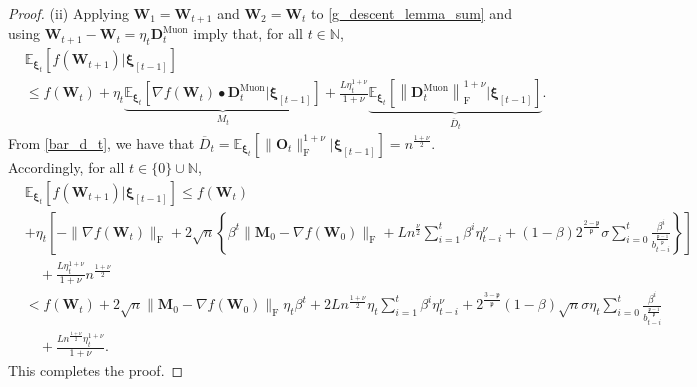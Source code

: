 \documentclass[10pt,a4paper]{amsart}
\begin{document}
\begin{proof}
(ii) Applying $\bm{W}_1 = \bm{W}_{t+1}$ and $\bm{W}_2 = \bm{W}_t$ to \eqref{g_descent_lemma_sum} and using $\bm{W}_{t+1} - \bm{W}_t = \eta_t \bm{D}_t^{\mathrm{Muon}}$ imply that, for all $t \in \mathbb{N}$,
\begin{align*}
&\mathbb{E}_{\bm{\xi}_t} \left[ f(\bm{W}_{t+1})|\bm{\xi}_{[t-1]} \right]\\
&\leq 
f(\bm{W}_t) 
+ \eta_t 
\underbrace{\mathbb{E}_{\bm{\xi}_t} \left[ \nabla f (\bm{W}_t) \bullet \bm{D}_t^{\mathrm{Muon}} |\bm{\xi}_{[t-1]} \right]}_{M_t}
+ \frac{L \eta_t^{1 + \nu}}{1 + \nu} 
\underbrace{\mathbb{E}_{\bm{\xi}_t} \left[
\left\| \bm{D}_t^{\mathrm{Muon}} \right\|_{\mathrm{F}}^{1 + \nu} \Big| \bm{\xi}_{[t-1]} \right]}_{\overline{D}_t}.
\end{align*}
From \eqref{bar_d_t}, we have that $\overline{D}_t = \mathbb{E}_{\bm{\xi}_t} [ \| \bm{O}_t \|_{\mathrm{F}}^{1 + \nu} | \bm{\xi}_{[t-1]}] = n^{\frac{1 + \nu}{2}}$. Accordingly, for all $t \in \{0\} \cup \mathbb{N}$,
\begin{align}\label{ineq_muon}
&\mathbb{E}_{\bm{\xi}_t} \left[ f(\bm{W}_{t+1})|\bm{\xi}_{[t-1]} \right]
\leq 
f(\bm{W}_t) \nonumber\\
&+ \eta_t 
\left[ - \| \nabla f (\bm{W}_t) \|_{\mathrm{F}}
+ 2 \sqrt{n}
\left\{  
\beta^t \| \bm{M}_{0} - \nabla f(\bm{W}_{0}) \|_{\mathrm{F}}
+ L n^{\frac{\nu}{2}} \sum_{i=1}^t \beta^i \eta_{t-i}^\nu 
+ (1 - \beta) 2^{\frac{2 - \mathfrak{p}}{\mathfrak{p}}} \sigma
\sum_{i=0}^t 
\frac{\beta^i}{b_{t-i}^{\frac{\mathfrak{p} -1}{\mathfrak{p}}}}
\right\} \right] \nonumber\\ 
&\quad + \frac{L \eta_t^{1 + \nu}}{1 + \nu} 
n^{\frac{1 + \nu}{2}} \nonumber\\
&< 
f(\bm{W}_t)
+ 2 \sqrt{n} \| \bm{M}_{0} - \nabla f(\bm{W}_{0}) \|_{\mathrm{F}} \eta_t \beta^t
+ 2 L n^{\frac{1+\nu}{2}} \eta_t \sum_{i=1}^t \beta^i \eta_{t-i}^\nu
+ 2^{\frac{3 - \mathfrak{p}}{\mathfrak{p}}} (1 - \beta) \sqrt{n} \sigma \eta_t 
\sum_{i=0}^t 
\frac{\beta^i}{b_{t-i}^{\frac{\mathfrak{p} -1}{\mathfrak{p}}}} \nonumber\\
&\quad+
\frac{L n^{\frac{1 + \nu}{2}} \eta_t^{1 + \nu}}{1 + \nu}.  
\end{align}
This completes the proof.
\end{proof}
\end{document}

